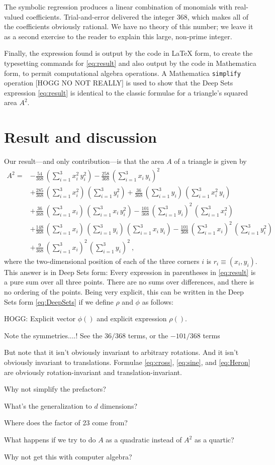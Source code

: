 \documentclass[12pt]{article}
\begin{document}
The symbolic regression produces a linear combination of monomials with real-valued coefficients.
Trial-and-error delivered the integer 368, which makes all of the coefficients obviously rational.
We have no theory of this number; we leave it as a second exercise to the reader to explain this large, non-prime integer.

Finally, the expression found is output by the code in LaTeX form, to create the typesetting commands for \eqref{eq:result} and also output by the code in Mathematica form, to permit computational algebra operations.
A Mathematica \texttt{simplify} operation [HOGG NO NOT REALLY] is used to show that the Deep Sets expression \eqref{eq:result} is identical to the classic formulae for a triangle's squared area $A^2$.

\section{Result and discussion}\label{sec:result}
Our result---and only contribution---is that the area $A$ of a triangle is given by
\begin{align}
A^2 = &
-\frac{ 54}{368}\,(\sum_{i=1}^3 x_i^2\,y_i^2) 
-\frac{258}{368}\,(\sum_{i=1}^3 x_i\,y_i)^2 \nonumber \\ &
+\frac{285}{368}\,(\sum_{i=1}^3 x_i^2)\,(\sum_{i=1}^3 y_i^2) 
+\frac{ 36}{368}\,(\sum_{i=1}^3 y_i)\,(\sum_{i=1}^3 x_i^2\,y_i) \nonumber \\ &
+\frac{ 36}{368}\,(\sum_{i=1}^3 x_i)\,(\sum_{i=1}^3 x_i\,y_i^2) 
-\frac{101}{368}\,(\sum_{i=1}^3 y_i)^2\,(\sum_{i=1}^3 x_i^2) \nonumber \\ &
+\frac{148}{368}\,(\sum_{i=1}^3 x_i)\,(\sum_{i=1}^3 y_i)\,(\sum_{i=1}^3 x_i\,y_i) 
-\frac{101}{368}\,(\sum_{i=1}^3 x_i)^2\,(\sum_{i=1}^3 y_i^2) \nonumber \\ &
+\frac{  9}{368}\,(\sum_{i=1}^3 x_i)^2\,(\sum_{i=1}^3 y_i)^2 ~, \label{eq:result}
\end{align}
where the two-dimensional position of each of the three corners $i$ is $r_i \equiv (x_i, y_i)$.
This answer is in Deep Sets form:
Every expression in parentheses in \eqref{eq:result} is a pure sum over all three points.
There are no sums over differences, and there is no ordering of the points.
Being very explicit, this can be written in the Deep Sets form \eqref{eq:DeepSets} if we define $\rho$ and $\phi$ as follows:

HOGG: Explicit vector $\phi()$ and explicit expression $\rho()$.

Note the symmetries....! See the $36/368$ terms, or the $-101/368$ terms

But note that it isn't obviously invariant to arbitrary rotations.
And it isn't obviously invariant to translations.
Formulae \eqref{eq:cross}, \eqref{eq:sine}, and \eqref{eq:Heron} are obviously rotation-invariant and translation-invariant.

Why not simplify the prefactors?

What's the generalization to $d$ dimensions?

Where does the factor of 23 come from?

What happens if we try to do $A$ as a quadratic instead of $A^2$ as a quartic?

Why not get this with computer algebra?
\end{document}
